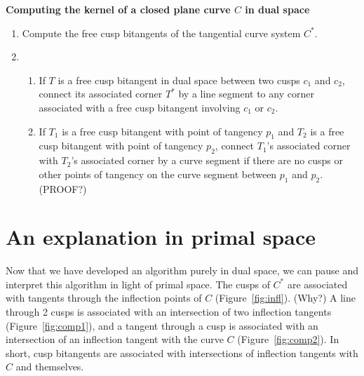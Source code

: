 \documentclass[12pt]{article}
\begin{document}
\centerline{{\bf Computing the kernel of a closed plane curve $C$ in dual space}}

\begin{enumerate}
\item	Compute the free cusp bitangents of the tangential curve system $C^*$.
\item
\begin{enumerate}
\item	If $T$ is a free cusp bitangent in dual space between two cusps $c_1$ 
	and $c_2$,
	connect its associated corner $T^*$ by a line segment to any corner
	associated with a free cusp bitangent involving $c_1$ or $c_2$.
\item	If $T_1$ is a free cusp bitangent with point of tangency $p_1$
	and $T_2$ is a free cusp bitangent with point of tangency $p_2$,
	connect $T_1$'s associated corner 
	with $T_2$'s associated corner by a curve segment
	if there are no cusps or other points of tangency on the 
	curve segment between $p_1$ and $p_2$.
	(PROOF?)
\end{enumerate}
\end{enumerate}


\section{An explanation in primal space}

Now that we have developed an algorithm purely in dual space,
we can pause and interpret this algorithm in light of primal space.
The cusps of $C^*$ are associated with tangents through the inflection points
of $C$ (Figure~\ref{fig:infl}).  (Why?)
A line through 2 cusps is associated with an intersection of two
inflection tangents (Figure~\ref{fig:comp1}),
and a tangent through a cusp is associated with an intersection of an
inflection tangent with the curve $C$ (Figure~\ref{fig:comp2}).
In short, cusp bitangents are associated with intersections of 
inflection tangents with $C$ and themselves.
\end{document}
